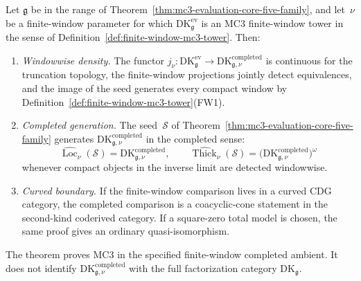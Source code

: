 \begin{theorem}
\label{thm:compact-completed-mc3-comparison}
%
%
Let $\mathfrak g$ be in the range of
Theorem~\ref{thm:mc3-evaluation-core-five-family}, and let~$\nu$ be a
finite-window parameter for which
$\mathrm{DK}^{\mathrm{ev}}_{\mathfrak g}$ is an MC3 finite-window
tower in the sense of Definition~\ref{def:finite-window-mc3-tower}.
Then:
\begin{enumerate}[label=\textup{(\roman*)},nosep]
\item \emph{Windowwise density.}  The functor
	 $j_\nu\colon\mathrm{DK}^{\mathrm{ev}}_{\mathfrak g}\to
	 \mathrm{DK}^{\mathrm{completed}}_{\mathfrak g,\nu}$
	 is continuous for the truncation topology, the finite-window
	 projections jointly detect equivalences, and the image of the seed
	 generates every compact window by
	 Definition~\ref{def:finite-window-mc3-tower}\textup{(FW1)}.
\item \emph{Completed generation.}  The seed~$\mathcal S$ of
 Theorem~\ref{thm:mc3-evaluation-core-five-family} generates
 $\mathrm{DK}^{\mathrm{completed}}_{\mathfrak g,\nu}$ in the
 completed sense:
 \[
 \widehat{\operatorname{Loc}}_\nu(\mathcal S)
 =
 \mathrm{DK}^{\mathrm{completed}}_{\mathfrak g,\nu},
 \qquad
 \widehat{\operatorname{Thick}}_\nu(\mathcal S)
 =
 \bigl(\mathrm{DK}^{\mathrm{completed}}_{\mathfrak g,\nu}\bigr)^\omega
 \]
 whenever compact objects in the inverse limit are detected
 windowwise.
\item \emph{Curved boundary.}  If the finite-window comparison lives
 in a curved CDG category, the completed comparison is a coacyclic-cone
 statement in the second-kind coderived category.  If a square-zero
 total model is chosen, the same proof gives an ordinary
 quasi-isomorphism.
\end{enumerate}
The theorem proves MC3 in the specified finite-window completed
ambient.  It does not identify
$\mathrm{DK}^{\mathrm{completed}}_{\mathfrak g,\nu}$ with the full
factorization category $\mathrm{DK}_{\mathfrak g}$.
\end{theorem}

